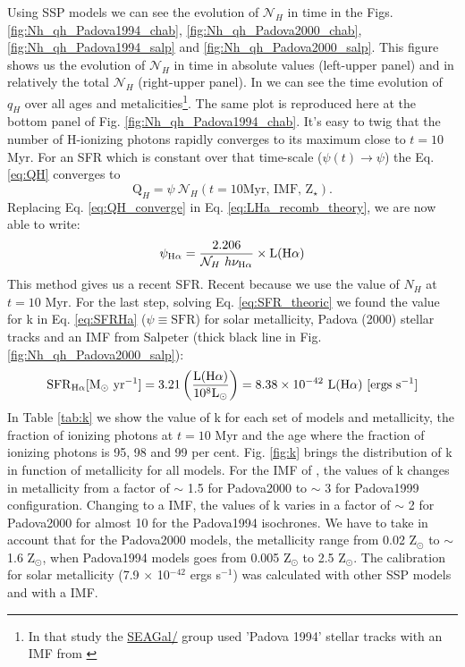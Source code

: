 \documentclass[12pt,letterpaper,usenatbib,useAMS]{article}
\def\Ha{\ifmmode \mathrm{H}\alpha \else H$\alpha$\xspace \fi}
\def\LHalpha{\ifmmode \mathrm{L}(\mathrm{H}\alpha) \else L(H$\alpha$)\xspace \fi}
\begin{document}
Using \citet{BC03a} SSP models we can see the evolution of $\mathcal{N}_H$ in time in the Figs. \ref{fig:Nh_qh_Padova1994_chab}, \ref{fig:Nh_qh_Padova2000_chab}, \ref{fig:Nh_qh_Padova1994_salp} and \ref{fig:Nh_qh_Padova2000_salp}. This figure shows us the evolution of $\mathcal{N}_H$ in time in absolute values (left-upper panel) and in relatively the total $\mathcal{N}_H$ (right-upper panel). In \citet[Fig. 2b]{CF.etal.2011} we can see the time evolution of $q_H$ over all ages and metalicities\footnote{In that study the \href{http://starlight.ufsc.br}{SEAGal/\STARLIGHT} group used 'Padova 1994' \citep{Bertelli.etal.1994} stellar tracks with an IMF from \citet{Chabrier.2003a}}. The same plot is reproduced here at the bottom panel of Fig. \ref{fig:Nh_qh_Padova1994_chab}. It's easy to twig that the number of H-ionizing photons rapidly converges to its maximum close to $t=10$ Myr. For an SFR which is constant over that time-scale ($\psi(t) \rightarrow \psi$) the Eq. \ref{eq:QH} converges to
\begin{equation}
	\mathrm{Q}_H = \psi\ \mathcal{N}_H(t=10\textrm{Myr, IMF, Z}{}_\star).
	\label{eq:QH_converge}
\end{equation}
\noindent Replacing Eq. \ref{eq:QH_converge} in Eq. \ref{eq:LHa_recomb_theory}, we are now able to write:
\begin{equation}
	\psi_{\Ha} = \frac{2.206}{\mathcal{N}_H\ h \nu_{\Ha}} \times \LHalpha
	\label{eq:SFR_theoric}
\end{equation}
\noindent This method gives us a recent SFR. Recent because we use the value of $N_H$ at $t=10$ Myr. For the last step, solving Eq. \ref{eq:SFR_theoric} we found the value for k in Eq. \ref{eq:SFRHa} ($\psi \equiv \mathrm{SFR}$) for solar metallicity, Padova (2000) stellar tracks and an IMF from Salpeter (thick black line in Fig. \ref{fig:Nh_qh_Padova2000_salp}):
\begin{equation}
	\mathrm{SFR}_{\Ha} [\mathrm{M}_\odot\ \mathrm{yr}^{-1}] = 3.21\left(\frac{\LHalpha}{10^8\mathrm{L}_\odot}\right) = 8.38 \times 10^{-42}\ \LHalpha\  [\mathrm{ergs}\ \mathrm{s}^{-1}]
	\label{eq:SFRNeb}
\end{equation}
In Table \ref{tab:k} we show the value of k for each set of models and metallicity, the fraction of ionizing photons at $t=10$ Myr and the age where the fraction of ionizing photons is 95, 98 and 99 per cent. Fig. \ref{fig:k} brings the distribution of k in function of metallicity for all models. For the IMF of \citet{Salpeter.1955a}, the values of k changes in metallicity from a factor of $\sim$ 1.5 for Padova2000 to $\sim$ 3 for Padova1999 configuration. Changing to a \citet{Chabrier.2003a} IMF, the values of k varies in a factor of $\sim$ 2 for Padova2000 for almost 10 for the Padova1994 isochrones. We have to take in account that for the Padova2000 models, the metallicity range from 0.02 Z$_\odot$ to $\sim$ 1.6 Z$_\odot$, when Padova1994 models goes from 0.005 Z$_\odot$ to 2.5 Z$_\odot$. The \citet{Kennicutt.1998a} calibration for solar metallicity (7.9 $\times$ 10$^{-42}$ ergs s$^{-1}$) was calculated with other SSP models and with a \citet{Salpeter.1955a} IMF.
\end{document}
